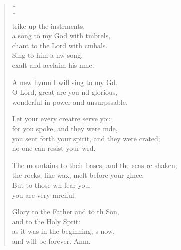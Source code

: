 \settowidth{\versewidth}{The mountains to their bases, and the seas are shaken; *}
\begin{verse}[\versewidth]
  \begin{patverse}
    trike up the instrments,\Flex\\
a song to my God with t\pointup{\i}mbrels,\Med\\
chant to the Lord with cmbals.\\
Sing to him a nw song,\Med\\
exalt and acclaim his nme.

A new hymn I will sing to my Gd.\Flex\\
O Lord, great are you nd glorious,\Med\\
wonderful in power and unsurpssable.

Let your every creatre serve you;\Med\\
for you spoke, and they were mde,\\
you sent forth your spirit, and they were crated;\Med\\
no one can resist your wrd.

The mountains to their bases, and the seas re shaken;\Med\\
the rocks, like wax, melt before your glnce.\\
But to those wh fear you,\Med\\
you are very mrciful.

Glory to the Father and to th Son,\Med\\
and to the Holy Sp\pointup{\i}rit:\\
as it was in the beginning, \pointup{\i}s now,\Med\\
and will be forever. Amn. 
  \end{patverse}
\end{verse}
